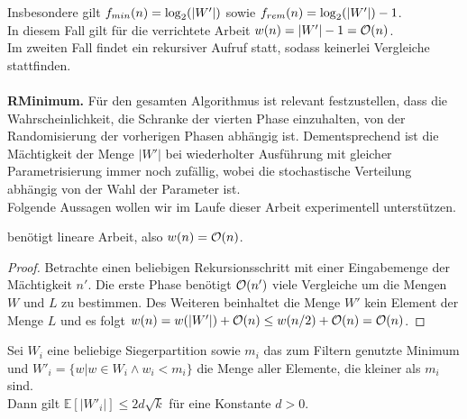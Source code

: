 Insbesondere gilt $f_{min}(n) = \log_2(|W'|)$ sowie $f_{rem}(n) = \log_2(|W'|)-1$.\\[.075cm]
In diesem Fall gilt für die verrichtete Arbeit $w(n)=|W'|-1=\mathcal{O}(n)$.\\[.075cm]
Im zweiten Fall findet ein rekursiver Aufruf statt, sodass keinerlei Vergleiche stattfinden.
\\[.05cm]
\noindent\makebox[\linewidth]{\color{gray}{\hdashrule[0.5ex]{\linewidth}{0.5pt}{1.5mm}}}\\[.05cm]
\noindent
\textbf{RMinimum.} Für den gesamten Algorithmus ist relevant festzustellen, dass die Wahrscheinlichkeit, die Schranke der vierten Phase einzuhalten, von der Randomisierung der vorherigen Phasen abhängig ist. Dementsprechend ist die Mächtigkeit der Menge $|W'|$ bei wiederholter Ausführung mit gleicher Parametrisierung immer noch zufällig, wobei die stochastische Verteilung abhängig von der Wahl der Parameter ist.\\[.2cm]
Folgende Aussagen wollen wir im Laufe dieser Arbeit experimentell unterstützen.\\[.05cm]
\noindent\makebox[\linewidth]{\color{gray}{\hdashrule[0.5ex]{\linewidth}{0.5pt}{1.5mm}}}
\begin{manualtheorem}{3}\label{theo: min_3}
\Rm benötigt lineare Arbeit, also $w(n)=\mathcal{O}(n)$.
\end{manualtheorem}
\begin{proof}
Betrachte einen beliebigen Rekursionsschritt mit einer Eingabemenge der Mächtigkeit $n'$. Die erste Phase benötigt $\mathcal{O}(n')$ viele Vergleiche um die Mengen $W$ und $L$ zu bestimmen. Des Weiteren beinhaltet die Menge $W'$ kein Element der Menge $L$ und es folgt $w(n)= w(|W'|) + \mathcal{O}(n) \leq w(n/2) + \mathcal{O}(n) = \mathcal{O}(n)$. 
\end{proof}
\begin{manuallemma}{2}\label{lem: min_2}
Sei $W_i$ eine beliebige Siegerpartition sowie $m_i$ das zum Filtern genutzte Minimum und $W'_i=\{w|w\in W_i \wedge w_i < m_i\}$ die Menge aller Elemente, die kleiner als $m_i$ sind.\\
Dann gilt $\mathbb{E}[|W'_i|]\leq 2d\sqrt{k}$ für eine Konstante $d>0$.
\end{manuallemma}
